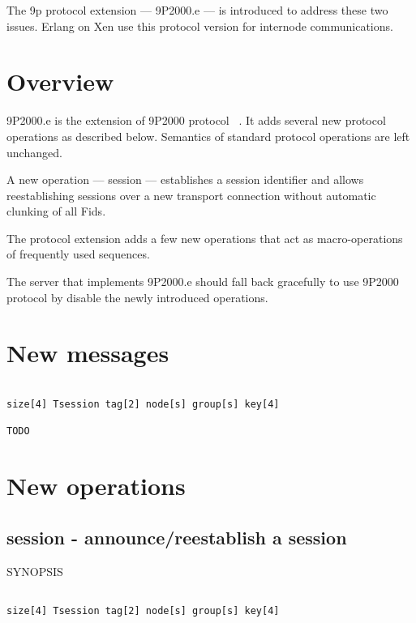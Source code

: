 The 9p protocol extension --- 9P2000.e --- is introduced to address these two
issues. Erlang on Xen use this protocol version for internode communications.

\chapter{Overview}
\label{overview}

9P2000.e is the extension of 9P2000 protocol ~\citep{9P2000}. It adds several new
protocol operations as described below. Semantics of standard protocol
operations are left unchanged.

A new operation --- session --- establishes a session identifier and allows
reestablishing sessions over a new transport connection without automatic
clunking of all Fids.

The protocol extension adds a few new operations that act as macro-operations of
frequently used sequences.

The server that implements 9P2000.e should fall back gracefully to use 9P2000
protocol by disable the newly introduced operations.

\chapter{New messages}
\label{newmessages}

\begin{adjustwidth}{2.5em}{2.5em}
\begin{verbatim}

size[4] Tsession tag[2] node[s] group[s] key[4]

TODO

\end{verbatim}
\end{adjustwidth}

\chapter{New operations}
\label{newoperations}

\section{session - announce\slash reestablish a session}
\label{session-announcereestablishasession}

SYNOPSIS

\begin{adjustwidth}{2.5em}{2.5em}
\begin{verbatim}

size[4] Tsession tag[2] node[s] group[s] key[4]

\end{verbatim}
\end{adjustwidth}

